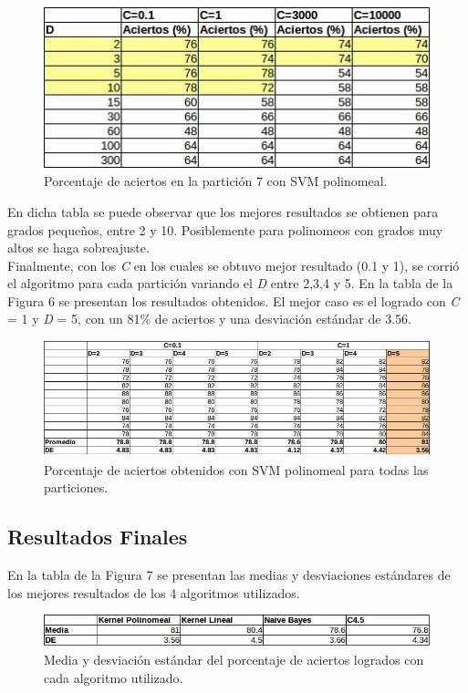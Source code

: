 \documentclass[12pt, a4paper]{article}
\begin{document}
 \begin{figure}
    \centering
	\includegraphics[scale=0.9]{tabla5}
	\caption{Porcentaje de aciertos en la partición 7 con SVM polinomeal.}
\end{figure}

En dicha tabla se puede observar que los mejores resultados se obtienen para grados pequeños, entre 2 y 10. Posiblemente para polinomeos con grados muy altos se haga sobreajuste. \\
Finalmente, con los \textit{C} en los cuales se obtuvo mejor resultado (0.1 y 1), se corrió el algoritmo para cada partición variando el \textit{D} entre 2,3,4 y 5. En la tabla de la Figura 6 se presentan los resultados obtenidos. El mejor caso es el logrado con \textit{C} = 1 y \textit{D} = 5, con un 81\% de aciertos y una desviación estándar de 3.56.

 \begin{figure}
    \centering
	\includegraphics[scale=0.8]{tabla6}
	\caption{Porcentaje de aciertos obtenidos con SVM polinomeal para todas las particiones.}
\end{figure}

\subsection*{Resultados Finales}
En la tabla de la Figura 7 se presentan las medias y desviaciones estándares de los mejores resultados de los 4 algoritmos utilizados.


 \begin{figure}
    \centering
	\includegraphics[scale=0.95]{tabla9}
	\caption{Media y desviación estándar del porcentaje de aciertos logrados con cada algoritmo utilizado.}
\end{figure}
\end{document}
